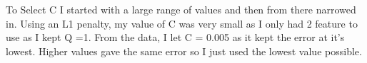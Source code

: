 \documentclass[11pt]{article} %
\begin{document}
\begin{figure}[h]
\centering
{}
\qquad
{}
\qquad
{}
\qquad
{}
\qquad
\end{figure}
To Select C I started with a large range of values and then from there narrowed in. Using an L1 penalty, my value of C was very small as I only had 2 feature to use as I kept Q =1. From the data, I let C = 0.005 as it kept the error at it's lowest. Higher values gave the same error so I just used the lowest value possible.
\end{document}
